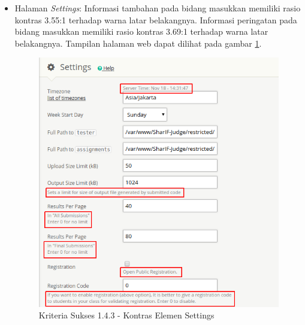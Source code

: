 \documentclass[a4paper,twoside]{article}
\begin{document}
\begin{enumerate}
\begin{itemize}
			\item Halaman \textit{Settings}: Informasi tambahan pada bidang masukkan memiliki rasio kontras 3.55:1 terhadap warna latar belakangnya. Informasi peringatan pada bidang masukkan memiliki rasio kontras 3.69:1 terhadap warna latar belakangnya. Tampilan halaman web dapat dilihat pada gambar \ref{fig:kepatuhan_1_4_3_settings}.
			\begin{figure}[H]
				\centering  
				\includegraphics[scale=0.5]{kepatuhan_1_4_3_settings}  
				\caption[Kriteria Sukses 1.4.3 - Kontras Elemen Settings]{Kriteria Sukses 1.4.3 - Kontras Elemen Settings} 
				\label{fig:kepatuhan_1_4_3_settings} 
			\end{figure}
			

\end{itemize}
\end{enumerate}
\end{document}
